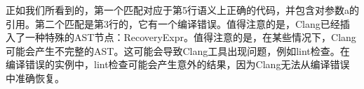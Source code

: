 正如我们所看到的，第一个匹配对应于第5行语义上正确的代码，并包含对参数a的引用。第二个匹配是第3行的，它有一个编译错误。值得注意的是，Clang已经插入了一种特殊的AST节点：RecoveryExpr。值得注意的是，在某些情况下，Clang可能会产生不完整的AST。这可能会导致Clang工具出现问题，例如lint检查。在编译错误的实例中，lint检查可能会产生意外的结果，因为Clang无法从编译错误中准确恢复。




















































































